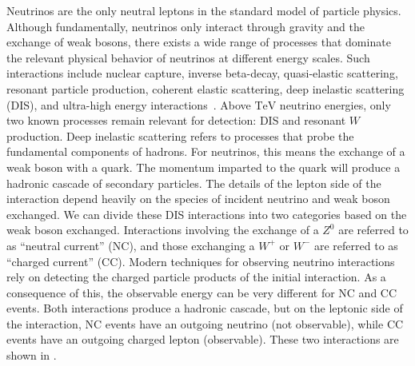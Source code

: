 Neutrinos are the only neutral leptons in the standard model of particle physics.
Although fundamentally, neutrinos only interact through gravity and the exchange of weak bosons, there exists a wide range of processes that dominate the relevant physical behavior of neutrinos at different energy scales.
Such interactions include nuclear capture, inverse beta-decay, quasi-elastic scattering, resonant particle production, coherent elastic scattering, deep inelastic scattering (DIS), and ultra-high energy interactions~\cite{Vannucci:2017rqs,Akimov:2017ade}.
Above $\si\TeV$ neutrino energies, only two known processes remain relevant for detection: DIS and resonant $W$ production.
Deep inelastic scattering refers to processes that probe the fundamental components of hadrons.
For neutrinos, this means the exchange of a weak boson with a quark.
The momentum imparted to the quark will produce a hadronic cascade of secondary particles.
The details of the lepton side of the interaction depend heavily on the species of incident neutrino and weak boson exchanged.
We can divide these DIS interactions into two categories based on the weak boson exchanged.
Interactions involving the exchange of a $Z^0$ are referred to as ``neutral current'' (NC), and those exchanging a $W^+$ or $W^-$ are referred to as ``charged current'' (CC).
Modern techniques for observing neutrino interactions rely on detecting the charged particle products of the initial interaction.
As a consequence of this, the observable energy can be very different for NC and CC events.
Both interactions produce a hadronic cascade, but on the leptonic side of the interaction, NC events have an outgoing neutrino (not observable), while CC events have an outgoing charged lepton (observable).
These two interactions are shown in .

